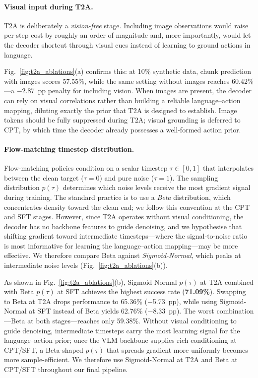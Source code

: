 \documentclass{llmxive}
\begin{document}
\paragraph{Visual input during T2A.}

T2A is deliberately a \emph{vision-free} stage.
Including image observations would raise per-step cost by roughly an order of
magnitude and, more importantly, would let the decoder shortcut through
visual cues instead of learning to ground actions in language.

Fig.~\ref{fig:t2a_ablations}(a) confirms this: at 10\% synthetic
data, chunk prediction with images scores 57.55\%, while the same setting
without images reaches 60.42\%---a $-$2.87~pp penalty for including vision.
When images are present, the decoder can rely on visual correlations
rather than building a reliable language--action mapping, diluting exactly
the prior that T2A is designed to establish.
{Image tokens should be fully suppressed during T2A}; visual grounding
is deferred to CPT, by which time the decoder already possesses a
well-formed action prior.


\paragraph{Flow-matching timestep distribution.}

Flow-matching policies condition on a scalar timestep $\tau \in [0,1]$ that
interpolates between the clean target ($\tau{=}0$) and pure noise ($\tau{=}1$).
The sampling distribution $p(\tau)$ determines which noise levels receive the
most gradient signal during training. The standard practice is to use a \emph{Beta}
distribution, which concentrates density toward the clean end; we follow this
convention at the CPT and SFT stages.
However, since T2A operates without visual conditioning, the decoder has no
backbone features to guide denoising, and we hypothesise that shifting
gradient toward intermediate timesteps---where the signal-to-noise ratio is
most informative for learning the language--action mapping---may be more
effective.
We therefore compare Beta against \emph{Sigmoid-Normal}, which peaks at
intermediate noise levels (Fig.~\ref{fig:t2a_ablations}(b)).


As shown in Fig.~\ref{fig:t2a_ablations}(b), Sigmoid-Normal $p(\tau)$ at T2A
combined with Beta $p(\tau)$ at SFT achieves the highest success rate
(\textbf{71.09\%}).
Swapping to Beta at T2A drops performance to 65.36\% ($-$5.73~pp), while
using Sigmoid-Normal at SFT instead of Beta yields 62.76\% ($-$8.33~pp).
The worst combination---Beta at both stages---reaches only 59.38\%.
Without visual conditioning to guide denoising, intermediate timesteps carry
the most learning signal for the language--action prior;
once the VLM backbone supplies rich conditioning at CPT/SFT, a Beta-shaped
$p(\tau)$ that spreads gradient more uniformly becomes more sample-efficient.
We therefore use {Sigmoid-Normal at T2A} and {Beta at CPT/SFT}
throughout our final pipeline.
\end{document}
